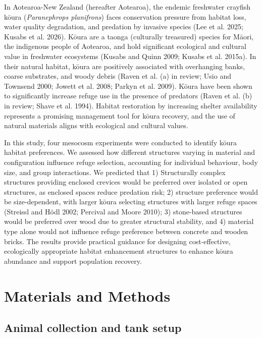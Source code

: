 \documentclass[
  12pt,
  a4paper,
  oneside]{scrbook}
\begin{document}
In Aotearoa-New Zealand (hereafter Aotearoa), the endemic freshwater
crayfish kōura (\emph{Paranephrops planifrons}) faces conservation
pressure from habitat loss, water quality degradation, and predation by
invasive species (Lee et al. 2025; Kusabs et al. 2026). Kōura are a
taonga (culturally treasured) species for Māori, the indigenous people
of Aotearoa, and hold significant ecological and cultural value in
freshwater ecosystems (Kusabs and Quinn 2009; Kusabs et al. 2015a). In
their natural habitat, kōura are positively associated with overhanging
banks, coarse substrates, and woody debris (Raven et al. (a) in review;
Usio and Townsend 2000; Jowett et al. 2008; Parkyn et al. 2009). Kōura
have been shown to significantly increase refuge use in the presence of
predators (Raven et al. (b) in review; Shave et al. 1994). Habitat
restoration by increasing shelter availability represents a promising
management tool for kōura recovery, and the use of natural materials
aligns with ecological and cultural values.

In this study, four mesocosm experiments were conducted to identify
kōura habitat preferences. We assessed how different structures varying
in material and configuration influence refuge selection, accounting for
individual behaviour, body size, and group interactions. We predicted
that 1) Structurally complex structures providing enclosed crevices
would be preferred over isolated or open structures, as enclosed spaces
reduce predation risk; 2) structure preference would be size-dependent,
with larger kōura selecting structures with larger refuge spaces
(Streissl and Hödl 2002; Percival and Moore 2010); 3) stone-based
structures would be preferred over wood due to greater structural
stability, and 4) material type alone would not influence refuge
preference between concrete and wooden bricks. The results provide
practical guidance for designing cost-effective, ecologically
appropriate habitat enhancement structures to enhance kōura abundance
and support population recovery.

\section{Materials and Methods}\label{materials-and-methods-2}

\subsection{Animal collection and tank
setup}\label{animal-collection-and-tank-setup}
\end{document}
